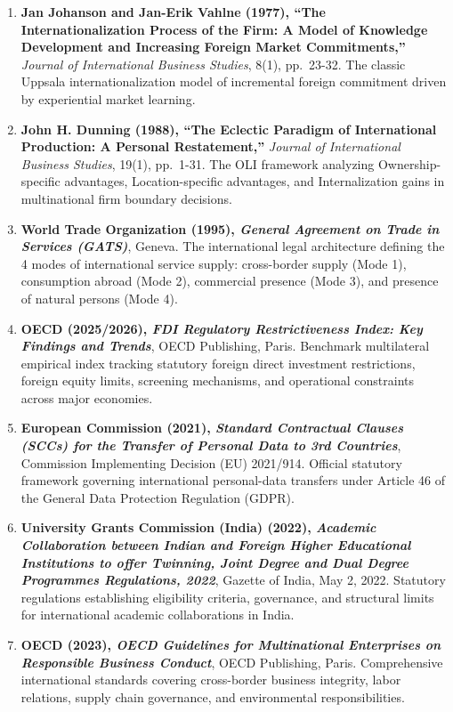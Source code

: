 \begin{enumerate}
\item \textbf{Jan Johanson and Jan-Erik Vahlne (1977), ``The Internationalization Process of the Firm: A Model of Knowledge Development and Increasing Foreign Market Commitments,''} \textit{Journal of International Business Studies}, 8(1), pp.~23-32. The classic Uppsala internationalization model of incremental foreign commitment driven by experiential market learning.
\item \textbf{John H. Dunning (1988), ``The Eclectic Paradigm of International Production: A Personal Restatement,''} \textit{Journal of International Business Studies}, 19(1), pp.~1-31. The OLI framework analyzing Ownership-specific advantages, Location-specific advantages, and Internalization gains in multinational firm boundary decisions.
\item \textbf{World Trade Organization (1995), \textit{General Agreement on Trade in Services (GATS)}}, Geneva. The international legal architecture defining the 4 modes of international service supply: cross-border supply (Mode 1), consumption abroad (Mode 2), commercial presence (Mode 3), and presence of natural persons (Mode 4).
\item \textbf{OECD (2025/2026), \textit{FDI Regulatory Restrictiveness Index: Key Findings and Trends}}, OECD Publishing, Paris. Benchmark multilateral empirical index tracking statutory foreign direct investment restrictions, foreign equity limits, screening mechanisms, and operational constraints across major economies.
\item \textbf{European Commission (2021), \textit{Standard Contractual Clauses (SCCs) for the Transfer of Personal Data to 3rd Countries}}, Commission Implementing Decision (EU) 2021/914. Official statutory framework governing international personal-data transfers under Article 46 of the General Data Protection Regulation (GDPR).
\item \textbf{University Grants Commission (India) (2022), \textit{Academic Collaboration between Indian and Foreign Higher Educational Institutions to offer Twinning, Joint Degree and Dual Degree Programmes Regulations, 2022}}, Gazette of India, May 2, 2022. Statutory regulations establishing eligibility criteria, governance, and structural limits for international academic collaborations in India.
\item \textbf{OECD (2023), \textit{OECD Guidelines for Multinational Enterprises on Responsible Business Conduct}}, OECD Publishing, Paris. Comprehensive international standards covering cross-border business integrity, labor relations, supply chain governance, and environmental responsibilities.

\end{enumerate}
